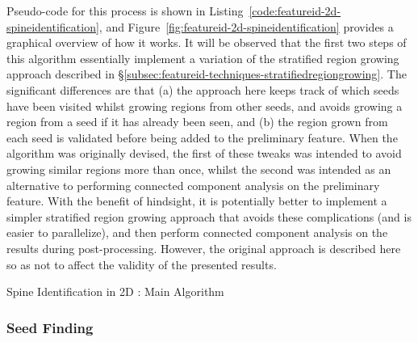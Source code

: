 \noindent Pseudo-code for this process is shown in Listing~\ref{code:featureid-2d-spineidentification}, and Figure~\ref{fig:featureid-2d-spineidentification} provides a graphical overview of how it works. It will be observed that the first two steps of this algorithm essentially implement a variation of the stratified region growing approach described in \S\ref{subsec:featureid-techniques-stratifiedregiongrowing}. The significant differences are that (a) the approach here keeps track of which seeds have been visited whilst growing regions from other seeds, and avoids growing a region from a seed if it has already been seen, and (b) the region grown from each seed is validated before being added to the preliminary feature. When the algorithm was originally devised, the first of these tweaks was intended to avoid growing similar regions more than once, whilst the second was intended as an alternative to performing connected component analysis on the preliminary feature. With the benefit of hindsight, it is potentially better to implement a simpler stratified region growing approach that avoids these complications (and is easier to parallelize), and then perform connected component analysis on the results during post-processing. However, the original approach is described here so as not to affect the validity of the presented results.

\begin{stulisting}[p]
\caption{Spine Identification in 2D : Main Algorithm}
\label{code:featureid-2d-spineidentification}

\end{stulisting}

\subsubsection{Seed Finding}

